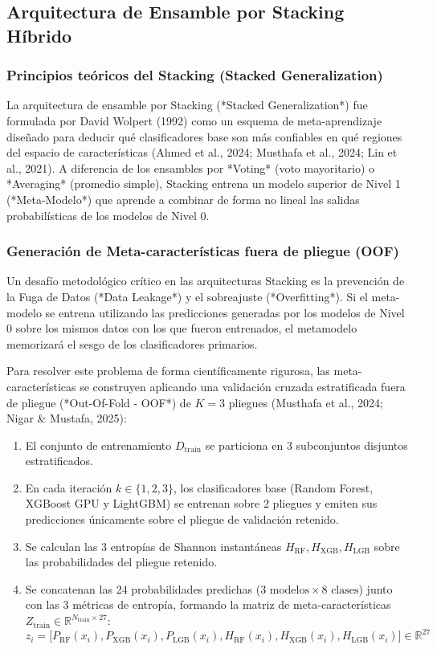 \subsection{Arquitectura de Ensamble por Stacking Híbrido}

\subsubsection{Principios teóricos del Stacking (Stacked Generalization)}
La arquitectura de ensamble por Stacking (*Stacked Generalization*) fue formulada por David Wolpert (1992) como un esquema de meta-aprendizaje diseñado para deducir qué clasificadores base son más confiables en qué regiones del espacio de características (Ahmed et al., 2024; Musthafa et al., 2024; Lin et al., 2021). A diferencia de los ensambles por *Voting* (voto mayoritario) o *Averaging* (promedio simple), Stacking entrena un modelo superior de Nivel 1 (*Meta-Modelo*) que aprende a combinar de forma no lineal las salidas probabilísticas de los modelos de Nivel 0.

\subsubsection{Generación de Meta-características fuera de pliegue (OOF)}
Un desafío metodológico crítico en las arquitecturas Stacking es la prevención de la Fuga de Datos (*Data Leakage*) y el sobreajuste (*Overfitting*). Si el meta-modelo se entrena utilizando las predicciones generadas por los modelos de Nivel 0 sobre los mismos datos con los que fueron entrenados, el metamodelo memorizará el sesgo de los clasificadores primarios.

Para resolver este problema de forma científicamente rigurosa, las meta-características se construyen aplicando una validación cruzada estratificada fuera de pliegue (*Out-Of-Fold - OOF*) de $K=3$ pliegues (Musthafa et al., 2024; Nigar \& Mustafa, 2025):
\begin{enumerate}
    \item El conjunto de entrenamiento $D_{\mathrm{train}}$ se particiona en 3 subconjuntos disjuntos estratificados.
    \item En cada iteración $k \in \{1, 2, 3\}$, los clasificadores base (Random Forest, XGBoost GPU y LightGBM) se entrenan sobre 2 pliegues y emiten sus predicciones únicamente sobre el pliegue de validación retenido.
    \item Se calculan las 3 entropías de Shannon instantáneas $H_{\mathrm{RF}}, H_{\mathrm{XGB}}, H_{\mathrm{LGB}}$ sobre las probabilidades del pliegue retenido.
    \item Se concatenan las 24 probabilidades predichas ($3 \text{ modelos} \times 8 \text{ clases}$) junto con las 3 métricas de entropía, formando la matriz de meta-características $Z_{\mathrm{train}} \in \mathbb{R}^{N_{\mathrm{train}} \times 27}$:
    \begin{equation}
    z_i = \Big[ P_{\mathrm{RF}}(x_i), P_{\mathrm{XGB}}(x_i), P_{\mathrm{LGB}}(x_i), H_{\mathrm{RF}}(x_i), H_{\mathrm{XGB}}(x_i), H_{\mathrm{LGB}}(x_i) \Big] \in \mathbb{R}^{27}
    \end{equation}
\end{enumerate}

